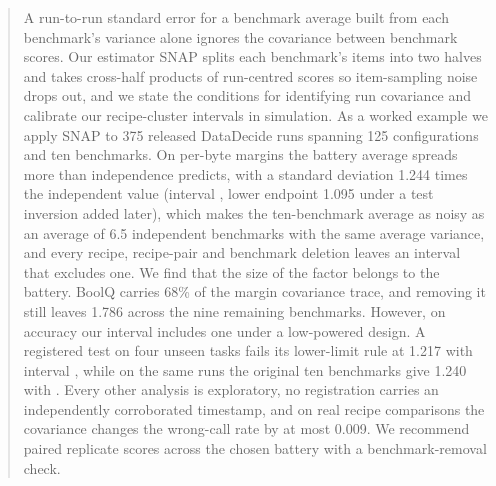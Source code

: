 \begin{abstract}
A run-to-run standard error for a benchmark average built from each benchmark's variance alone ignores the covariance between benchmark scores. Our estimator SNAP splits each benchmark's items into two halves and takes cross-half products of run-centred scores so item-sampling noise drops out, and we state the conditions for identifying run covariance and calibrate our recipe-cluster intervals in simulation. As a worked example we apply SNAP to 375 released DataDecide runs spanning 125 configurations and ten benchmarks. On per-byte margins the battery average spreads more than independence predicts, with a standard deviation 1.244 times the independent value (interval , lower endpoint 1.095 under a test inversion added later), which makes the ten-benchmark average as noisy as an average of 6.5 independent benchmarks with the same average variance, and every recipe, recipe-pair and benchmark deletion leaves an interval that excludes one.  We find that the size of the factor belongs to the battery. BoolQ carries 68\% of the margin covariance trace, and removing it still leaves 1.786 across the nine remaining benchmarks. However, on accuracy our interval  includes one under a low-powered design. A registered test on four unseen tasks fails its lower-limit rule at 1.217 with interval , while on the same runs the original ten benchmarks give 1.240 with . Every other analysis is exploratory, no registration carries an independently corroborated timestamp, and on real recipe comparisons the covariance changes the wrong-call rate by at most 0.009. We recommend paired replicate scores across the chosen battery with a benchmark-removal check.
\end{abstract}

